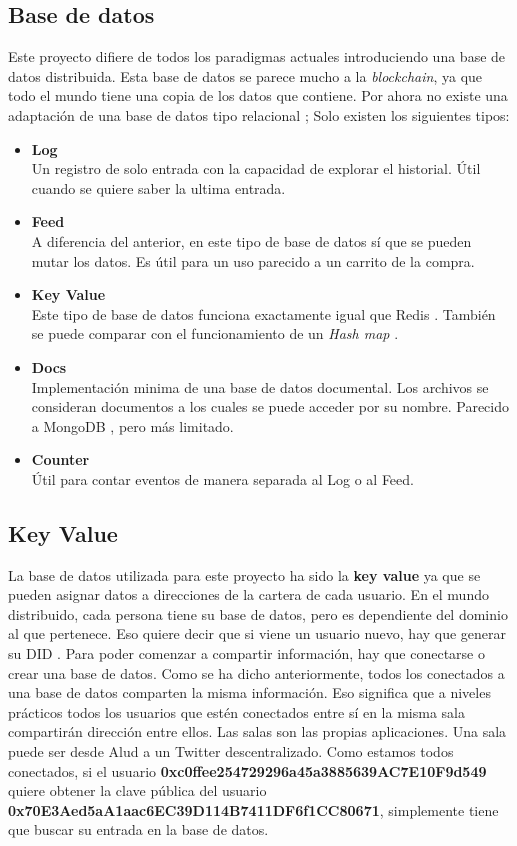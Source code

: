 \subsection{Base de datos}
Este proyecto difiere de todos los paradigmas actuales introduciendo una base de datos distribuida. Esta base de datos se parece mucho a la \textit{blockchain}, ya que todo el mundo tiene una copia de los datos que contiene. Por ahora no existe una adaptación de una base de datos tipo relacional \cite{web:relational-database}; Solo existen los siguientes tipos:
\begin{itemize}
    \item \textbf{Log}\\
    Un registro de solo entrada con la capacidad de explorar el historial. Útil cuando se quiere saber la ultima entrada.
    \item \textbf{Feed}\\
    A diferencia del anterior, en este tipo de base de datos sí que se pueden mutar los datos. Es útil para un uso parecido a un carrito de la compra.
    \item \textbf{Key Value}\\
    Este tipo de base de datos funciona exactamente igual que Redis \cite{web:redis}. También se puede  comparar con el funcionamiento de un \textit{Hash map} \cite{web:hash-table}.
    \item \textbf{Docs} \\
    Implementación minima de una base de datos documental. Los archivos se consideran documentos a los cuales se puede acceder por su nombre. Parecido a MongoDB \cite{web:mongodb}, pero más limitado.
    \item \textbf{Counter} \\
    Útil para contar eventos de manera separada al Log o al Feed.
\end{itemize}
\subsection{Key Value}
La base de datos utilizada para este proyecto ha sido la \textbf{key value} ya que se pueden asignar datos a direcciones de la cartera de cada usuario.
En el mundo distribuido, cada persona tiene su base de datos, pero es dependiente del dominio al que pertenece. Eso quiere decir que si viene un usuario nuevo, hay que generar su DID \cite{web:did}.
Para poder comenzar a compartir información, hay que conectarse o crear una base de datos. Como se ha dicho anteriormente, todos los conectados a una base de datos comparten la misma información. Eso significa que a niveles prácticos todos los usuarios que estén conectados entre sí en la misma sala compartirán dirección entre ellos.
Las salas son las propias aplicaciones. Una sala puede ser desde Alud a un Twitter descentralizado.
Como estamos todos conectados, si el usuario \textbf{0xc0ffee254729296a45a3885639AC7E10F9d549} quiere obtener la clave pública del usuario \textbf{0x70E3Aed5aA1aac6EC39D114B7411DF6f1CC80671}, simplemente tiene que buscar su entrada en la base de datos.
